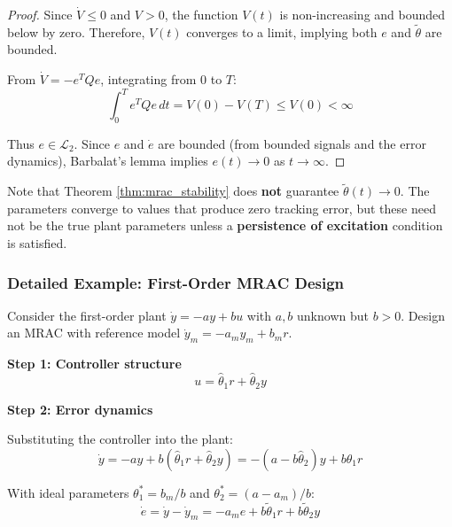 \begin{proof}
Since $\dot{V} \leq 0$ and $V > 0$, the function $V(t)$ is non-increasing and bounded below by zero. Therefore, $V(t)$ converges to a limit, implying both $e$ and $\tilde{\theta}$ are bounded.

From $\dot{V} = -e^T Q e$, integrating from $0$ to $T$:
\begin{equation}
\int_0^T e^T Q e \, dt = V(0) - V(T) \leq V(0) < \infty
\label{eq:integral_bound}
\end{equation}

Thus $e \in \mathcal{L}_2$. Since $e$ and $\dot{e}$ are bounded (from bounded signals and the error dynamics), Barbalat's lemma implies $e(t) \to 0$ as $t \to \infty$.
\end{proof}

\begin{remark}
Note that Theorem \ref{thm:mrac_stability} does \textbf{not} guarantee $\tilde{\theta}(t) \to 0$. The parameters converge to values that produce zero tracking error, but these need not be the true plant parameters unless a \textbf{persistence of excitation} condition is satisfied.
\end{remark}

\subsubsection{Detailed Example: First-Order MRAC Design}

Consider the first-order plant $\dot{y} = -ay + bu$ with $a, b$ unknown but $b > 0$. Design an MRAC with reference model $\dot{y}_m = -a_m y_m + b_m r$.

\textbf{Step 1: Controller structure}
\begin{equation}
u = \hat{\theta}_1 r + \hat{\theta}_2 y
\end{equation}

\textbf{Step 2: Error dynamics}

Substituting the controller into the plant:
\begin{equation}
\dot{y} = -ay + b(\hat{\theta}_1 r + \hat{\theta}_2 y) = -(a - b\hat{\theta}_2)y + b\hat{\theta}_1 r
\end{equation}

With ideal parameters $\theta_1^* = b_m/b$ and $\theta_2^* = (a-a_m)/b$:
\begin{equation}
\dot{e} = \dot{y} - \dot{y}_m = -a_m e + b\tilde{\theta}_1 r + b\tilde{\theta}_2 y
\end{equation}

